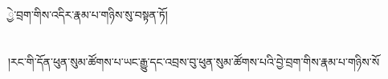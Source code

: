 ྱེ་བྲག་གིས་འདིར་རྣམ་པ་གཉིས་སུ་བསྟན་ཏོ།\chapter{ }།རང་གི་དོན་ཕུན་སུམ་ཚོགས་པ་ཡང་རྒྱུ་དང་འབྲས་བུ་ཕུན་སུམ་ཚོགས་པའི་བྱེ་བྲག་གིས་རྣམ་པ་གཉིས་སོ